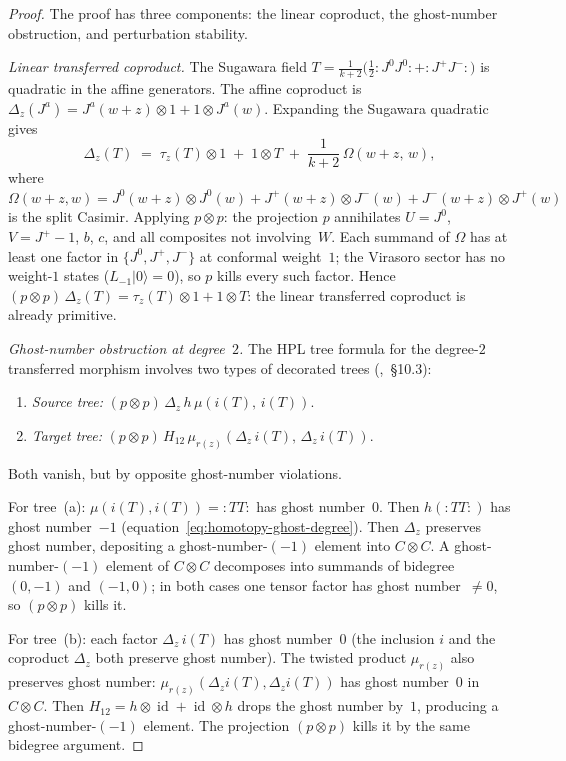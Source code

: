\begin{proof}
The proof has three components: the linear coproduct, the
ghost-number obstruction, and perturbation stability.

\emph{Linear transferred coproduct.}
The Sugawara field $T = \frac{1}{k+2}\bigl(\frac{1}{2}
{:}J^0 J^0{:} + {:}J^+ J^-{:}\bigr)$ is quadratic in the
affine generators. The affine coproduct is
$\Delta_z(J^a) = J^a(w+z) \otimes 1 + 1 \otimes J^a(w)$.
Expanding the Sugawara quadratic gives
\begin{equation}\label{eq:delta-z-sugawara}
\Delta_z(T)
\;=\;
\tau_z(T) \otimes 1 \;+\; 1 \otimes T
\;+\; \frac{1}{k+2}\,\Omega(w+z,\,w),
\end{equation}
where $\Omega(w+z,w)
= J^0(w{+}z) \otimes J^0(w)
+ J^+(w{+}z) \otimes J^-(w)
+ J^-(w{+}z) \otimes J^+(w)$
is the split Casimir.
Applying $p \otimes p$: the projection $p$ annihilates
$U = J^0$, $V = J^+ - 1$, $b$, $c$, and all composites not
involving~$W$. Each summand of $\Omega$ has at least one factor
in $\{J^0, J^+, J^-\}$ at conformal weight~$1$; the Virasoro
sector has no weight-$1$ states ($L_{-1}|0\rangle = 0$), so
$p$ kills every such factor. Hence
$(p \otimes p)\,\Delta_z(T)
= \tau_z(T) \otimes 1 + 1 \otimes T$:
the linear transferred coproduct is already primitive.

\emph{Ghost-number obstruction at degree~$2$.}
The HPL tree formula for the degree-$2$ transferred
morphism involves two types of decorated trees
(\cite{LV12},~\S10.3):
\begin{enumerate}[label=\textup{(\alph*)}]
\item \emph{Source tree:}
 $(p \otimes p)\,\Delta_z\,h\,\mu(i(T),\, i(T))$.
\item \emph{Target tree:}
 $(p \otimes p)\,H_{12}\,\mu_{r(z)}
 (\Delta_z\,i(T),\, \Delta_z\,i(T))$.
\end{enumerate}
Both vanish, but by opposite ghost-number violations.

For tree~(a): $\mu(i(T), i(T)) = {:}TT{:}$ has ghost
number~$0$. Then $h({:}TT{:})$ has ghost number~$-1$
(equation~\eqref{eq:homotopy-ghost-degree}).
Then $\Delta_z$ preserves ghost number, depositing a
ghost-number-$(-1)$ element into $C \otimes C$.
A ghost-number-$(-1)$ element of $C \otimes C$ decomposes
into summands of bidegree $(0, -1)$ and $(-1, 0)$;
in both cases one tensor factor has ghost number~$\ne 0$,
so $(p \otimes p)$ kills it.

For tree~(b): each factor $\Delta_z\,i(T)$ has ghost
number~$0$ (the inclusion $i$ and the coproduct $\Delta_z$
both preserve ghost number). The twisted product $\mu_{r(z)}$
also preserves ghost number: $\mu_{r(z)}(\Delta_z i(T),
\Delta_z i(T))$ has ghost number~$0$ in $C \otimes C$.
Then $H_{12} = h \otimes \operatorname{id}
+ \operatorname{id} \otimes h$ drops the ghost number by~$1$,
producing a ghost-number-$(-1)$ element. The projection
$(p \otimes p)$ kills it by the same bidegree argument.


\end{proof}
